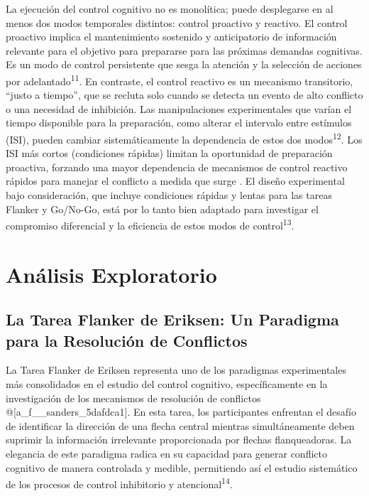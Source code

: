 \documentclass[
  spanish,
  10pt,
]{article}
\begin{document}
La ejecución del control cognitivo no es monolítica; puede desplegarse
en al menos dos modos temporales distintos: control proactivo y
reactivo. El control proactivo implica el mantenimiento sostenido y
anticipatorio de información relevante para el objetivo para prepararse
para las próximas demandas cognitivas. Es un modo de control persistente
que sesga la atención y la selección de acciones por
adelantado\textsuperscript{11}. En contraste, el control reactivo es un
mecanismo transitorio, ``justo a tiempo'', que se recluta solo cuando se
detecta un evento de alto conflicto o una necesidad de inhibición. Las
manipulaciones experimentales que varían el tiempo disponible para la
preparación, como alterar el intervalo entre estímulos (ISI), pueden
cambiar sistemáticamente la dependencia de estos dos
modos\textsuperscript{12}. Los ISI más cortos (condiciones rápidas)
limitan la oportunidad de preparación proactiva, forzando una mayor
dependencia de mecanismos de control reactivo rápidos para manejar el
conflicto a medida que surge . El diseño experimental bajo
consideración, que incluye condiciones rápidas y lentas para las tareas
Flanker y Go/No-Go, está por lo tanto bien adaptado para investigar el
compromiso diferencial y la eficiencia de estos modos de
control\textsuperscript{13}.

\section{Análisis Exploratorio}\label{anuxe1lisis-exploratorio}

\subsection{La Tarea Flanker de Eriksen: Un Paradigma para la Resolución
de
Conflictos}\label{la-tarea-flanker-de-eriksen-un-paradigma-para-la-resoluciuxf3n-de-conflictos}

La Tarea Flanker de Eriksen representa uno de los paradigmas
experimentales más consolidados en el estudio del control cognitivo,
específicamente en la investigación de los mecanismos de resolución de
conflictos @{[}a\_f\_\_sanders\_5dafdca1{]}. En esta tarea, los
participantes enfrentan el desafío de identificar la dirección de una
flecha central mientras simultáneamente deben suprimir la información
irrelevante proporcionada por flechas flanqueadoras. La elegancia de
este paradigma radica en su capacidad para generar conflicto cognitivo
de manera controlada y medible, permitiendo así el estudio sistemático
de los procesos de control inhibitorio y atencional\textsuperscript{14}.
\end{document}
